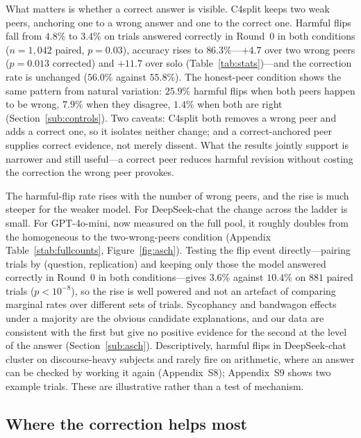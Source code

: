 \documentclass[11pt]{article}
\begin{document}
What matters is whether a correct answer is visible.
C4split keeps two weak peers, anchoring one to a wrong answer and one to the
correct one.
Harmful flips fall from $4.8\%$ to $3.4\%$ on trials answered correctly in
Round~0 in both conditions ($n = 1{,}042$ paired, $p = 0.03$), accuracy rises to
$86.3\%$---$+4.7$ over two wrong peers ($p = 0.013$ corrected) and $+11.7$ over
solo (Table~\ref{tab:stats})---and the correction rate is unchanged
($56.0\%$ against $55.8\%$).
The honest-peer condition shows the same pattern from natural variation:
$25.9\%$ harmful flips when both peers happen to be wrong, $7.9\%$ when they
disagree, $1.4\%$ when both are right (Section~\ref{sub:controls}).
Two caveats: C4split both removes a wrong peer and adds a correct one, so it
isolates neither change; and a correct-anchored peer supplies correct evidence,
not merely dissent.
What the results jointly support is narrower and still useful---a correct peer
reduces harmful revision without costing the correction the wrong peer
provokes.

The harmful-flip rate rises with the number of wrong peers, and the rise is
much steeper for the weaker model.
For DeepSeek-chat the change across the ladder is small.
For GPT-4o-mini, now measured on the full pool, it roughly doubles from the
homogeneous to the two-wrong-peers condition (Appendix
Table~\ref{stab:fullcounts}, Figure~\ref{fig:asch}).
Testing the flip event directly---pairing trials by (question, replication) and
keeping only those the model answered correctly in Round~0 in both
conditions---gives $3.6\%$ against $10.4\%$ on $881$ paired trials
($p<10^{-8}$), so the rise is well powered and not an artefact of comparing
marginal rates over different sets of trials.
Sycophancy \citep{sharma2023towards} and bandwagon effects under a majority
\citep{asch1951effects,koo2024benchmarking} are the obvious candidate
explanations, and our data are consistent with the first but give no positive
evidence for the second at the level of the answer
(Section~\ref{sub:asch}).
Descriptively, harmful flips in DeepSeek-chat cluster on discourse-heavy
subjects and rarely fire on arithmetic, where an answer can be checked by
working it again (Appendix~S8); Appendix~S9 shows two example trials.
These are illustrative rather than a test of mechanism.


\subsection{Where the correction helps most}
\label{sub:crossmodel}
\end{document}
